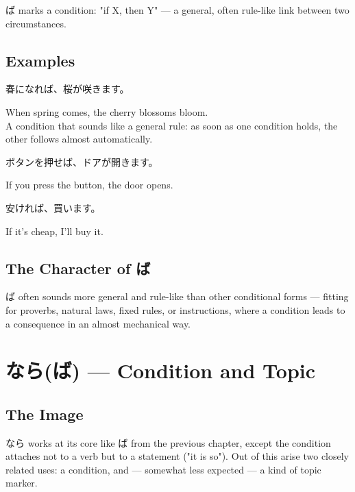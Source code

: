 \documentclass[12pt]{book}
\begin{document}
ば marks a condition: "if X, then Y" — a general, often rule-like link between two circumstances.

\section*{Examples}

\par\quad 春になれば、桜が咲きます。\\
\par\quad When spring comes, the cherry blossoms bloom.\\

A condition that sounds like a general rule: as soon as one condition holds, the other follows almost automatically.

\par\quad ボタンを押せば、ドアが開きます。\\
\par\quad If you press the button, the door opens.\\

\par\quad 安ければ、買います。\\
\par\quad If it's cheap, I'll buy it.\\

\section*{The Character of ば}

ば often sounds more general and rule-like than other conditional forms — fitting for proverbs, natural laws, fixed rules, or instructions, where a condition leads to a consequence in an almost mechanical way.


\chapter{なら(ば) — Condition and Topic}

\section*{The Image}

なら works at its core like ば from the previous chapter, except the condition attaches not to a verb but to a statement ("it is so"). Out of this arise two closely related uses: a condition, and — somewhat less expected — a kind of topic marker.
\end{document}
